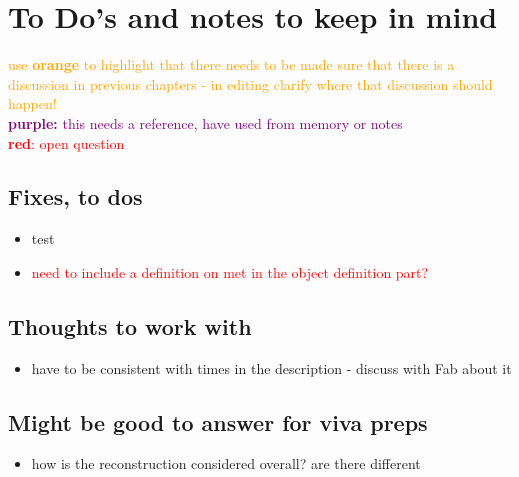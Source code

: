 \section{To Do's and notes to keep in mind}

\textcolor{orange}{use \textbf{orange} to highlight that there needs to be made sure that there is a discussion in previous chapters - in editing clarify where that discussion should happen!}\\
\textcolor{purple}{\textbf{purple:} this needs a reference,  have used from memory or notes}\\
\textcolor{red}{\textbf{red}: open question}




\subsection{Fixes, to dos}
\begin{itemize}
    \item test
    \item \textcolor{red}{need to include a definition on met in the object definition part? }
\end{itemize}





\subsection{Thoughts to work with}
\begin{itemize}
    \item have to be consistent with times in the description - discuss with Fab about it
\end{itemize}





\subsection{Might be good to answer for viva preps}
\begin{itemize}
    \item how is the reconstruction considered overall? are there different
\end{itemize}